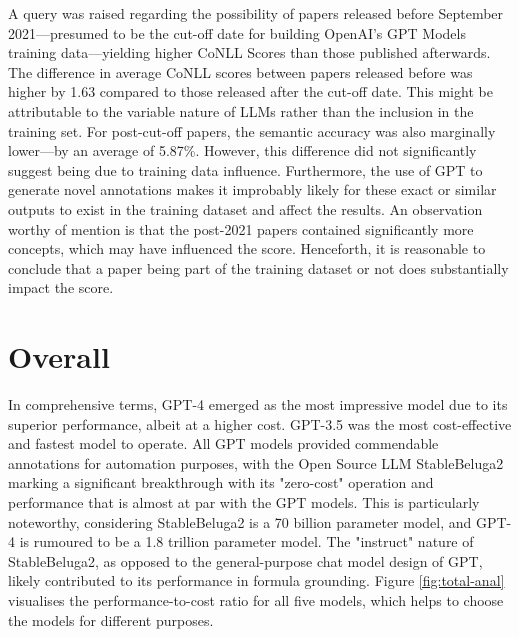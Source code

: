 A query was raised regarding the possibility of papers released before September 2021—presumed to be the cut-off date for building OpenAI's GPT Models training data—yielding higher CoNLL Scores than those published afterwards. The difference in average CoNLL scores between papers released before was higher by 1.63 compared to those released after the cut-off date. This might be attributable to the variable nature of LLMs rather than the inclusion in the training set. For post-cut-off papers, the semantic accuracy was also marginally lower—by an average of 5.87\%. However, this difference did not significantly suggest being due to training data influence.
Furthermore, the use of GPT to generate novel annotations makes it improbably likely for these exact or similar outputs to exist in the training dataset and affect the results. An observation worthy of mention is that the post-2021 papers contained significantly more concepts, which may have influenced the score. Henceforth, it is reasonable to conclude that a paper being part of the training dataset or not does substantially impact the score.

\section{Overall}

In comprehensive terms, GPT-4 emerged as the most impressive model due to its superior performance, albeit at a higher cost. GPT-3.5 was the most cost-effective and fastest model to operate. All GPT models provided commendable annotations for automation purposes, with the Open Source LLM StableBeluga2 marking a significant breakthrough with its "zero-cost" operation and performance that is almost at par with the GPT models. This is particularly noteworthy, considering StableBeluga2 is a 70 billion parameter model, and GPT-4 is rumoured to be a 1.8 trillion parameter model. The "instruct" nature of StableBeluga2, as opposed to the general-purpose chat model design of GPT, likely contributed to its performance in formula grounding. Figure \ref{fig:total-anal} visualises the performance-to-cost ratio for all five models, which helps to choose the models for different purposes.

